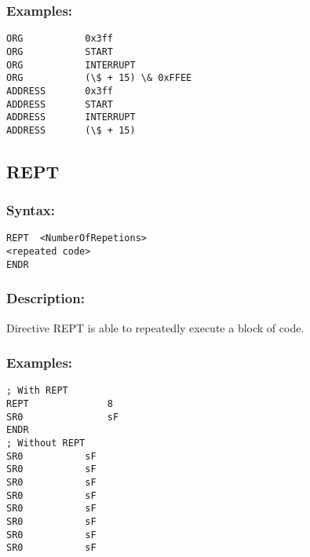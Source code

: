         \subsubsection{Examples:}
        {
            \usecodefont
            \verb'ORG           0x3ff'\\
            \verb'ORG           START'\\
            \verb'ORG           INTERRUPT'\\
            \verb'ORG           (\$ + 15) \& 0xFFEE'\\
            \verb'ADDRESS       0x3ff'\\
            \verb'ADDRESS       START'\\
            \verb'ADDRESS       INTERRUPT'\\
            \verb'ADDRESS       (\$ + 15)'\\
        }
    \subsection{REPT}
        \subsubsection{Syntax:}
        {
            \usecodefont
            \verb'REPT  <NumberOfRepetions>'\\
            \verb'<repeated code>'\\
            \verb'ENDR'
        }

        \subsubsection{Description:}
            Directive REPT is able to repeatedly execute a block of code.

        \subsubsection{Examples:}
        {
            \usecodefont
            \verb'; With REPT'\\
            \verb'REPT              8'\\
            \verb'SR0               sF'\\
            \verb'ENDR'\\
            \verb'; Without REPT'\\
            \verb'SR0           sF'\\
            \verb'SR0           sF'\\
            \verb'SR0           sF'\\
            \verb'SR0           sF'\\
            \verb'SR0           sF'\\
            \verb'SR0           sF'\\
            \verb'SR0           sF'\\
            \verb'SR0           sF'\\
        }


